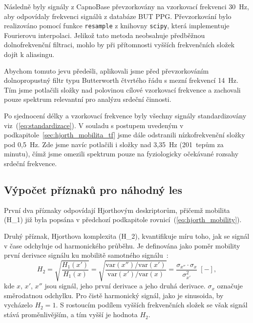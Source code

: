 Následně byly signály z CapnoBase převzorkovány na vzorkovací frekvenci 30~Hz, aby odpovídaly frekvenci signálů z databáze \acs{BUT PPG}.
Převzorkování bylo realizováno pomocí funkce \texttt{resample} z knihovny \texttt{scipy}, která implementuje Fourierovu interpolaci.
Jelikož tato metoda neobsahuje předběžnou dolnofrekvenční filtraci, mohlo by při přítomnosti vyšších frekvenčních složek dojít k aliasingu.

Abychom tomuto jevu předešli, aplikovali jsme před převzorkováním dolnopropustný filtr typu Butterworth čtvrtého řádu s mezní frekvencí 14~Hz.
Tím jsme potlačili složky nad polovinou cílové vzorkovací frekvence a zachovali pouze spektrum relevantní pro analýzu srdeční činnosti.

Po sjednocení délky a vzorkovací frekvence byly všechny signály standardizovány viz~(\ref{eq:standardizace}).
V souladu s postupem uvedeným v podkapitole~\ref{sec:hjorth_mobilita_tf} jsme dále odstranili nízkofrekvenční složky pod 0,5~Hz.
Zde jsme navíc potlačili i složky nad 3,35~Hz (201~tepům za minutu), čímž jsme omezili spektrum pouze na fyziologicky očekávané rozsahy srdeční frekvence.

\subsection*{Výpočet příznaků pro náhodný les}
\label{subsec:rf_features}
První dva příznaky odpovídají Hjorthovým deskriptorům, přičemž mobilita (\acs{H_1}) již byla popsána v předchozí podkapitole rovnicí~(\ref{eq:hjorth_mobility}).

Druhý příznak, Hjorthova komplexita (\acs{H_2}), kvantifikuje míru toho, jak se signál v čase odchyluje od harmonického průběhu.
Je definována jako poměr mobility první derivace signálu ku mobilitě samotného signálu~\cite{Hjorth1970,Geetika2022}:
\begin{equation}
	\label{eq:hjorth_complexity}
	H_{2} = \sqrt{ \frac{H_1(x')}{H_1(x)} }
	= \sqrt{ \frac{ \text{var}(x'') / \text{var}(x') }{ \text{var}(x') / \text{var}(x) } }
	= \frac{ \sigma_{x''} \cdot \sigma_{x} }{ \sigma_{x'}^2 } \; [-],
\end{equation}
kde $x$, $x'$, $x''$ jsou signál, jeho první derivace a jeho druhá derivace.
$\sigma_x$ označuje směrodatnou odchylku.
Pro čistě harmonický signál, jako je sinusoida, by vycházelo $H_2 = 1$.
S rostoucím podílem vyšších frekvenčních složek se však signál stává proměnlivějším, a tím vyšší je hodnota \( H_2 \).

